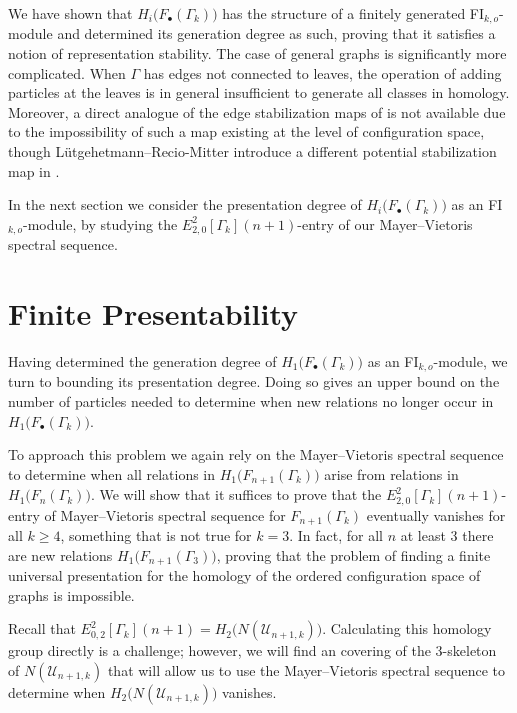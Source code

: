 \documentclass[pagebackref,colorlinks,citecolor=blue,linkcolor=blue,urlcolor=blue,filecolor=blue]{article}
\theoremstyle{definition}\newtheorem{definition}[thm]{Definition}
\theoremstyle{definition}
\begin{document}
We have shown that $H_{i}\big(F_{\bullet}(\Gamma_{k})\big)$ has the structure of a finitely generated FI$_{k,o}$-module and determined its generation degree as such, proving that it satisfies a notion of representation stability.
The case of general graphs is significantly more complicated. 
When $\Gamma$ has edges not connected to leaves, the operation of adding particles at the leaves is in general insufficient to generate all classes in homology.
Moreover, a direct analogue of the edge stabilization maps of \cite{an2020edge} is not available due to the impossibility of such a map existing at the level of configuration space, though L\"{u}tgehetmann--Recio-Mitter introduce a different potential stabilization map in \cite[Section 5]{lutgehetmann2021topological}.

In the next section we consider the presentation degree of $H_{i}\big(F_{\bullet}(\Gamma_{k})\big)$ as an FI$_{k,o}$-module, by studying the $E^{2}_{2,0}[\Gamma_{k}](n+1)$-entry of our Mayer--Vietoris spectral sequence.

\section{Finite Presentability}\label{presentability}
Having determined the generation degree of $H_{1}\big(F_{\bullet}(\Gamma_{k})\big)$ as an FI$_{k,o}$-module, we turn to bounding its presentation degree.
Doing so gives an upper bound on the number of particles needed to determine when new relations no longer occur in $H_{1}\big(F_{\bullet}(\Gamma_{k})\big)$.

To approach this problem we again rely on the Mayer--Vietoris spectral sequence to determine when all relations in $H_{1}\big(F_{n+1}(\Gamma_{k})\big)$ arise from relations in $H_{1}\big(F_{n}(\Gamma_{k})\big)$.
We will show that it suffices to prove that the $E^{2}_{2,0}[\Gamma_{k}](n+1)$-entry of Mayer--Vietoris spectral sequence for $F_{n+1}(\Gamma_{k})$ eventually vanishes for all $k\ge 4$, something that is not true for $k=3$.
In fact, for all $n$ at least $3$ there are new relations $H_{1}\big(F_{n+1}(\Gamma_{3})\big)$, proving that the problem of finding a finite universal presentation for the homology of the ordered configuration space of graphs is impossible. 

Recall that $E^{2}_{0,2}[\Gamma_{k}](n+1)=H_{2}\big(N(\mathcal{U}_{n+1, k})\big)$. 
Calculating this homology group directly is a challenge; however, we will find an covering of the $3$-skeleton of $N(\mathcal{U}_{n+1, k})$ that will allow us to use the Mayer--Vietoris spectral sequence to determine when $H_{2}\big(N(\mathcal{U}_{n+1, k})\big)$ vanishes.
\end{document}
